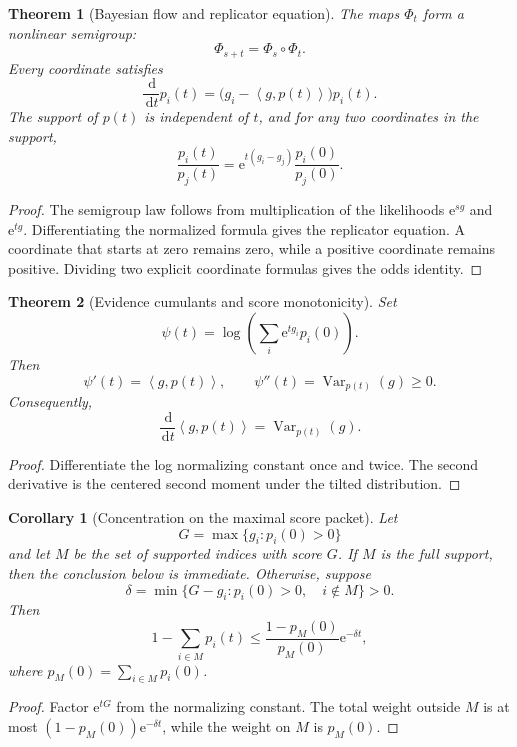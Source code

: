 \documentclass{aomart}
\newtheorem{theorem}{Theorem}[section]
\newtheorem{corollary}[corollary]{Corollary}
\theoremstyle{definition}
\theoremstyle{remark}
\newcommand{\Var}{\operatorname{Var}}
\newcommand{\e}{\mathrm e}
\newcommand{\dd}{\,\mathrm d}
\newcommand{\ip}[2]{\left\langle#1,#2\right\rangle}
\begin{document}
\begin{theorem}[Bayesian flow and replicator equation]\label{thm:bayesian_flow}
The maps \(\Phi_t\) form a nonlinear semigroup:
\[
\Phi_{s+t}=\Phi_s\circ\Phi_t.
\]
Every coordinate satisfies
\[
\frac{\dd}{\dd t}p_i(t)
=
\bigl(g_i-\ip{g}{p(t)}\bigr)p_i(t).
\]
The support of \(p(t)\) is independent of \(t\), and for any two coordinates in the support,
\[
\frac{p_i(t)}{p_j(t)}
=
\e^{t(g_i-g_j)}
\frac{p_i(0)}{p_j(0)}.
\]
\end{theorem}

\begin{proof}
The semigroup law follows from multiplication of the likelihoods \(\e^{sg}\) and \(\e^{tg}\). Differentiating the normalized formula gives the replicator equation. A coordinate that starts at zero remains zero, while a positive coordinate remains positive. Dividing two explicit coordinate formulas gives the odds identity.
\end{proof}

\begin{theorem}[Evidence cumulants and score monotonicity]\label{thm:evidence_cumulants}
Set
\[
\psi(t)
=
\log\left(
\sum_i\e^{tg_i}p_i(0)
\right).
\]
Then
\[
\psi'(t)=\ip{g}{p(t)},
\qquad
\psi''(t)=\Var_{p(t)}(g)\geq0.
\]
Consequently,
\[
\frac{\dd}{\dd t}\ip{g}{p(t)}
=
\Var_{p(t)}(g).
\]
\end{theorem}

\begin{proof}
Differentiate the log normalizing constant once and twice. The second derivative is the centered second moment under the tilted distribution.
\end{proof}

\begin{corollary}[Concentration on the maximal score packet]\label{cor:bayes_flow_concentration}
Let
\[
G=\max\{g_i:p_i(0)>0\}
\]
and let \(M\) be the set of supported indices with score \(G\). If \(M\) is the full support, then the conclusion below is immediate. Otherwise, suppose
\[
\delta
=
\min\{G-g_i:p_i(0)>0,
\quad i\notin M\}>0.
\]
Then
\[
1-\sum_{i\in M}p_i(t)
\leq
\frac{1-p_M(0)}{p_M(0)}\e^{-\delta t},
\]
where \(p_M(0)=\sum_{i\in M}p_i(0)\).
\end{corollary}

\begin{proof}
Factor \(\e^{tG}\) from the normalizing constant. The total weight outside \(M\) is at most \((1-p_M(0))\e^{-\delta t}\), while the weight on \(M\) is \(p_M(0)\).
\end{proof}
\end{document}

